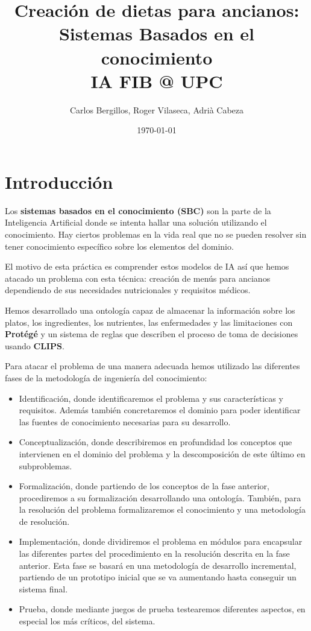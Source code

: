 \documentclass[12]{article}
\date{\today}
\author{Carlos Bergillos, Roger Vilaseca, Adrià Cabeza}
\title{Creación de dietas para ancianos: \\ Sistemas Basados en el conocimiento \\
	\large IA FIB @ UPC}
\begin{document}
\maketitle
\newpage
\tableofcontents
\newpage
\section{Introducción}
Los \textbf{sistemas basados en el conocimiento (SBC)} son la parte de la Inteligencia Artificial donde se intenta hallar una solución utilizando el conocimiento. Hay ciertos problemas en la vida real que no se pueden resolver sin tener conocimiento específico sobre los elementos del dominio. 
\par
El motivo de esta práctica es comprender estos modelos de IA así que hemos atacado un problema con esta técnica: creación de menús para ancianos dependiendo de sus necesidades nutricionales y requisitos médicos. 
\par
Hemos desarrollado una ontología capaz de almacenar la información sobre los platos, los ingredientes, los nutrientes, las enfermedades y las limitaciones con \textbf{Protégé} y un sistema de reglas que describen el proceso de toma de decisiones usando \textbf{CLIPS}.
\par
Para atacar el problema de una manera adecuada hemos utilizado las diferentes fases de la metodología de ingeniería del conocimiento: 

\begin{itemize}
\item Identificación, donde identificaremos el problema y sus características y requisitos. Además también concretaremos el dominio para poder identificar las fuentes de conocimiento necesarias para su desarrollo.
\item Conceptualización, donde describiremos en profundidad los conceptos que intervienen en el dominio del problema y la descomposición de este último en subproblemas. 
\item Formalización, donde partiendo de los conceptos de la fase anterior, procediremos a su formalización desarrollando una ontología. También, para la resolución del problema formalizaremos el conocimiento y una metodología de resolución.
\item Implementación, donde dividiremos el problema en módulos para encapsular las diferentes partes del procedimiento en la resolución descrita en la fase anterior. Esta fase se basará en una metodología de desarrollo incremental, partiendo de un prototipo inicial que se va aumentando hasta conseguir un sistema final. 
\item Prueba, donde mediante juegos de prueba testearemos diferentes aspectos, en especial los más críticos, del sistema. 
\end{itemize}
\end{document}
